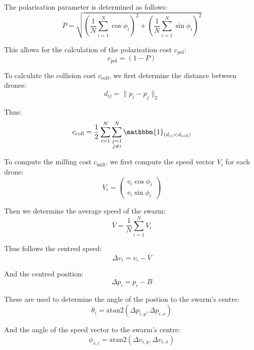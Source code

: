 \documentclass[conference]{IEEEtran}
\begin{document}
The polarisation parameter is determined as follows:
\begin{equation}
	P = \sqrt{\left( \frac{1}{N} \sum_{i=1}^{N} \cos \phi_i \right)^2 + \left( \frac{1}{N} \sum_{i=1}^{N} \sin \phi_i \right)^2}
\end{equation}

This allows for the calculation of the polarisation cost $c_{\text{pol}}$:
\begin{equation}
	c_{\text{pol}} = (1 - P)
\end{equation}

To calculate the collision cost $c_{\text{coll}}$, we first determine the distance between drones:
\begin{equation}
	d_{ij} = \| p_i - p_j \|_2
\end{equation}

Thus:
\begin{equation}
	c_{\text{coll}} = \frac{1}{2} \sum_{i=1}^{N} \sum_{\substack{j=1 \\ j \neq i}}^{N} \mathbbm{1}_{(d_{ij} < d_{\text{coll}})}
\end{equation}

To compute the milling cost $c_{\text{mill}}$, we first compute the speed vector $V_i$ for each drone:
\begin{equation}
	V_i = \begin{pmatrix} v_i \cos \phi_i \\ v_i \sin \phi_i \end{pmatrix}
\end{equation}

Then we determine the average speed of the swarm:
\begin{equation}
	\bar{V} = \frac{1}{N} \sum_{i=1}^{N} V_i
\end{equation}

Thus follows the centred speed:
\begin{equation}
\Delta v_i = v_i - \bar{V}
\end{equation}

And the centred position:
\begin{equation}
\Delta p_i = p_i - B
\end{equation}

These are used to determine the angle of the postion to the swarm's centre:
\begin{equation}
	\theta_i = \text{atan2}(\Delta p_{i, y}, \Delta p_{i, x})
\end{equation}

And the angle of the speed vector to the swarm's centre:
\begin{equation}
\phi_{v, i} = \text{atan2}(\Delta v_{i, y}, \Delta v_{i, x})
\end{equation}
\end{document}
